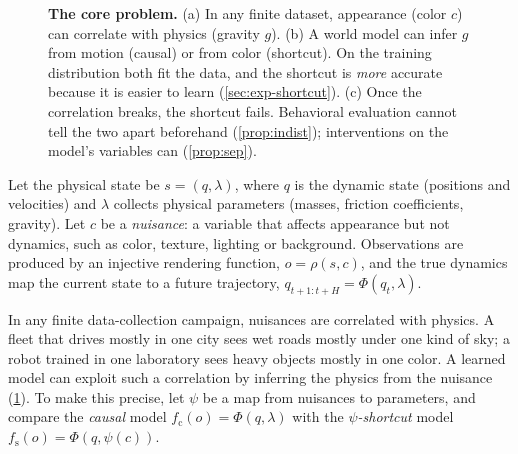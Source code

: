 \documentclass[11pt]{article}
\theoremstyle{definition}\newtheorem{definition}{Definition}
\begin{document}
\begin{figure}[t]
\caption{\textbf{The core problem.} (a) In any finite dataset, appearance (color $c$) can correlate with physics (gravity $g$). (b) A world model can infer $g$ from motion (causal) or from color (shortcut). On the training distribution both fit the data, and the shortcut is \emph{more} accurate because it is easier to learn (\cref{sec:exp-shortcut}). (c) Once the correlation breaks, the shortcut fails. Behavioral evaluation cannot tell the two apart beforehand (\cref{prop:indist}); interventions on the model's variables can (\cref{prop:sep}).}
\label{fig:teaser}
\end{figure}

Let the physical state be $s=(q,\lambda)$, where $q$ is the dynamic state (positions and velocities) and $\lambda$ collects physical parameters (masses, friction coefficients, gravity). Let $c$ be a \emph{nuisance}: a variable that affects appearance but not dynamics, such as color, texture, lighting or background. Observations are produced by an injective rendering function, $o=\rho(s,c)$, and the true dynamics map the current state to a future trajectory, $q_{t+1:t+H}=\Phi(q_t,\lambda)$.

In any finite data-collection campaign, nuisances are correlated with physics. A fleet that drives mostly in one city sees wet roads mostly under one kind of sky; a robot trained in one laboratory sees heavy objects mostly in one color. A learned model can exploit such a correlation by inferring the physics from the nuisance (\cref{fig:teaser}). To make this precise, let $\psi$ be a map from nuisances to parameters, and compare the \emph{causal} model $f_{\mathrm c}(o)=\Phi(q,\lambda)$ with the \emph{$\psi$-shortcut} model $f_{\mathrm s}(o)=\Phi(q,\psi(c))$.
\end{document}
